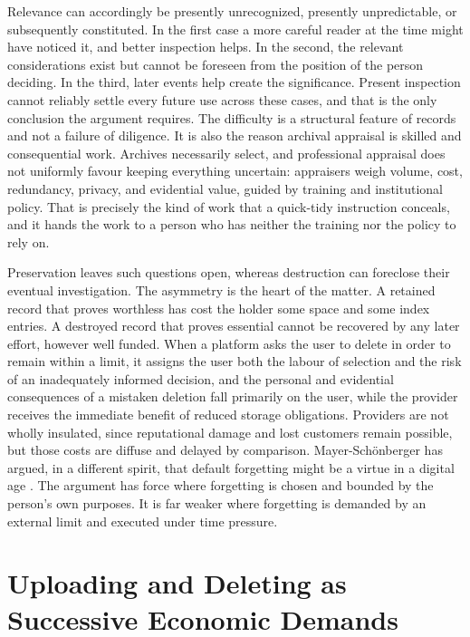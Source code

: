 \documentclass[12pt]{article}
\begin{document}
Relevance can accordingly be presently unrecognized, presently unpredictable, or subsequently constituted. In the first case a more careful reader at the time might have noticed it, and better inspection helps. In the second, the relevant considerations exist but cannot be foreseen from the position of the person deciding. In the third, later events help create the significance. Present inspection cannot reliably settle every future use across these cases, and that is the only conclusion the argument requires. The difficulty is a structural feature of records and not a failure of diligence. It is also the reason archival appraisal is skilled and consequential work. Archives necessarily select, and professional appraisal does not uniformly favour keeping everything uncertain: appraisers weigh volume, cost, redundancy, privacy, and evidential value, guided by training and institutional policy. That is precisely the kind of work that a quick-tidy instruction conceals, and it hands the work to a person who has neither the training nor the policy to rely on.

Preservation leaves such questions open, whereas destruction can foreclose their eventual investigation. The asymmetry is the heart of the matter. A retained record that proves worthless has cost the holder some space and some index entries. A destroyed record that proves essential cannot be recovered by any later effort, however well funded. When a platform asks the user to delete in order to remain within a limit, it assigns the user both the labour of selection and the risk of an inadequately informed decision, and the personal and evidential consequences of a mistaken deletion fall primarily on the user, while the provider receives the immediate benefit of reduced storage obligations. Providers are not wholly insulated, since reputational damage and lost customers remain possible, but those costs are diffuse and delayed by comparison. Mayer-Schönberger has argued, in a different spirit, that default forgetting might be a virtue in a digital age \cite{mayerschonberger2009}. The argument has force where forgetting is chosen and bounded by the person's own purposes. It is far weaker where forgetting is demanded by an external limit and executed under time pressure.

\section{Uploading and Deleting as Successive Economic Demands}
\end{document}
